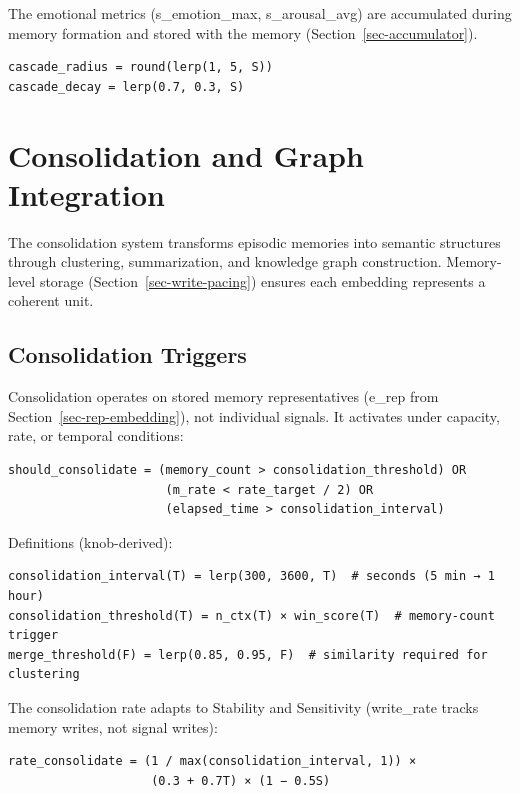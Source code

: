 \documentclass[
  letterpaper,
  DIV=11,
  numbers=noendperiod]{scrartcl}
\begin{document}
The emotional metrics (s\_emotion\_max, s\_arousal\_avg) are accumulated
during memory formation and stored with the memory
(Section~\ref{sec-accumulator}).

\begin{verbatim}
cascade_radius = round(lerp(1, 5, S))
cascade_decay = lerp(0.7, 0.3, S)
\end{verbatim}

\section{Consolidation and Graph Integration}\label{sec-consolidation}

The consolidation system transforms episodic memories into semantic
structures through clustering, summarization, and knowledge graph
construction. Memory-level storage (Section~\ref{sec-write-pacing})
ensures each embedding represents a coherent unit.

\subsection{Consolidation Triggers}\label{sec-consolidation-triggers}

Consolidation operates on stored memory representatives (e\_rep from
Section~\ref{sec-rep-embedding}), not individual signals. It activates
under capacity, rate, or temporal conditions:

\begin{verbatim}
should_consolidate = (memory_count > consolidation_threshold) OR
                      (m_rate < rate_target / 2) OR
                      (elapsed_time > consolidation_interval)
\end{verbatim}

Definitions (knob-derived):

\begin{verbatim}
consolidation_interval(T) = lerp(300, 3600, T)  # seconds (5 min → 1 hour)
consolidation_threshold(T) = n_ctx(T) × win_score(T)  # memory-count trigger
merge_threshold(F) = lerp(0.85, 0.95, F)  # similarity required for clustering
\end{verbatim}

The consolidation rate adapts to Stability and Sensitivity (write\_rate
tracks memory writes, not signal writes):

\begin{verbatim}
rate_consolidate = (1 / max(consolidation_interval, 1)) ×
                    (0.3 + 0.7T) × (1 − 0.5S)
\end{verbatim}
\end{document}
